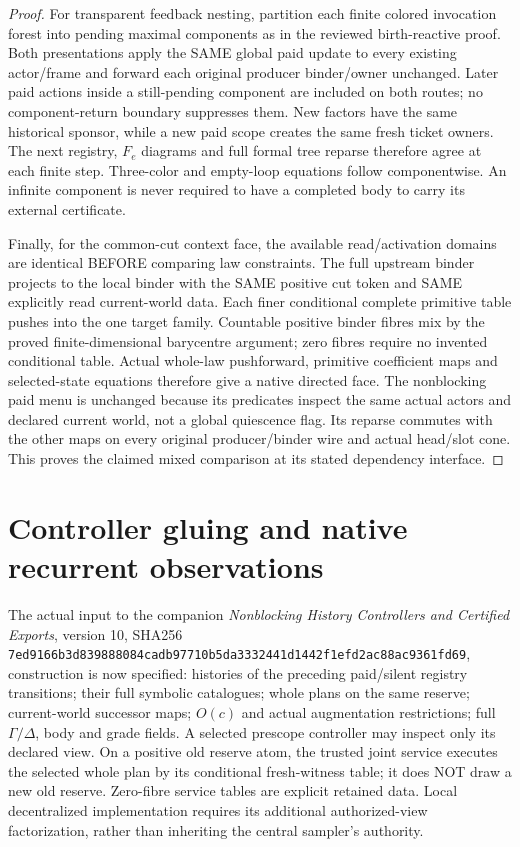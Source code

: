 \documentclass[11pt]{article}\usepackage{amsmath,amssymb,amsthm}
\begin{document}
\begin{proof}
For transparent feedback nesting, partition each finite colored invocation forest into pending maximal components as in the reviewed birth-reactive proof. Both presentations apply the SAME global paid update to every existing actor/frame and forward each original producer binder/owner unchanged. Later paid actions inside a still-pending component are included on both routes; no component-return boundary suppresses them. New factors have the same historical sponsor, while a new paid scope creates the same fresh ticket owners. The next registry, $F_e$ diagrams and full formal tree reparse therefore agree at each finite step. Three-color and empty-loop equations follow componentwise. An infinite component is never required to have a completed body to carry its external certificate.

Finally, for the common-cut context face, the available read/activation domains are identical BEFORE comparing law constraints. The full upstream binder projects to the local binder with the SAME positive cut token and SAME explicitly read current-world data. Each finer conditional complete primitive table pushes into the one target family. Countable positive binder fibres mix by the proved finite-dimensional barycentre argument; zero fibres require no invented conditional table. Actual whole-law pushforward, primitive coefficient maps and selected-state equations therefore give a native directed face. The nonblocking paid menu is unchanged because its predicates inspect the same actual actors and declared current world, not a global quiescence flag. Its reparse commutes with the other maps on every original producer/binder wire and actual head/slot cone. This proves the claimed mixed comparison at its stated dependency interface.\end{proof}

\section{Controller gluing and native recurrent observations}
The actual input to the companion \emph{Nonblocking History Controllers and Certified Exports}, version 10, SHA256 \texttt{7ed9166b3d839888084cadb97710b5da3332441d1442f1efd2ac88ac9361fd69}, construction is now specified: histories of the preceding paid/silent registry transitions; their full symbolic catalogues; whole plans on the same reserve; current-world successor maps; $O(c)$ and actual augmentation restrictions; full $\Gamma/\Delta$, body and grade fields. A selected prescope controller may inspect only its declared view. On a positive old reserve atom, the trusted joint service executes the selected whole plan by its conditional fresh-witness table; it does NOT draw a new old reserve. Zero-fibre service tables are explicit retained data. Local decentralized implementation requires its additional authorized-view factorization, rather than inheriting the central sampler's authority.
\end{document}
